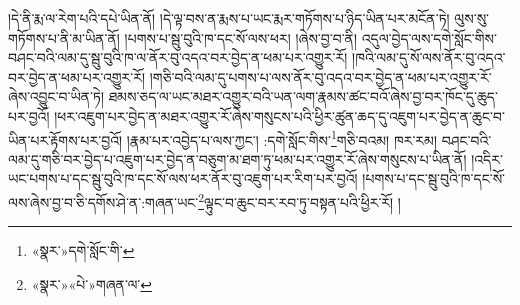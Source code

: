 །དེ་ནི་རྨ་ལ་རེག་པའི་དཔེ་ཡིན་ནོ། །དེ་ལྟ་བས་ན་རྨས་པ་ཡང་རྨར་གཏོགས་པ་ཉིད་ཡིན་པར་མངོན་ཏེ། ལུས་སུ་གཏོགས་པ་ནི་མ་ཡིན་ནོ། །པགས་པ་སྦུ་བུའི་ཁ་དང་སོ་ལས་ཕར། །ཞེས་བྱ་བ་ནི། འདུལ་བྱེད་ལས་དགེ་སློང་གིས་བཤང་བའི་ལམ་དུ་སྦུ་བུའི་ཁ་ལ་ནོར་བུ་འདའ་བར་བྱེད་ན་ཕམ་པར་འགྱུར་རོ། །ཁའི་ལམ་དུ་སོ་ལས་ནོར་བུ་འདའ་བར་བྱེད་ན་ཕམ་པར་འགྱུར་རོ། །གཅི་བའི་ལམ་དུ་པགས་པ་ལས་ནོར་བུ་འདའ་བར་བྱེད་ན་ཕམ་པར་འགྱུར་རོ་ཞེས་འབྱུང་བ་ཡིན་ཏེ། ཐམས་ཅད་ལ་ཡང་མཐར་འགྱུར་བའི་ཡན་ལག་རྣམས་ཚང་བའོ་ཞེས་བྱ་བར་ཁོང་དུ་ཆུད་པར་བྱའོ། །ཕར་འཇུག་པར་བྱེད་ན་མཐར་འགྱུར་རོ་ཞེས་གསུངས་པའི་ཕྱིར་ཚུན་ཆད་དུ་འཇུག་པར་བྱེད་ན་ཆུང་བ་ཡིན་པར་རྟོགས་པར་བྱའོ། །རྣམ་པར་འབྱེད་པ་ལས་ཀྱང་། :དགེ་སློང་གིས་\footnote{«སྣར་»དགེ་སློང་གི་}གཅི་བའམ། ཁར་རམ། བཤང་བའི་ལམ་དུ་གཅི་བར་བྱེད་པ་འཇུག་པར་བྱེད་ན་བཅུག་མ་ཐག་ཏུ་ཕམ་པར་འགྱུར་རོ་ཞེས་གསུངས་པ་ཡིན་ནོ། །འདིར་ཡང་པགས་པ་དང་སྦུ་བུའི་ཁ་དང་སོ་ལས་ཕར་ནོར་བུ་འཇུག་པར་རིག་པར་བྱའོ། །པགས་པ་དང་སྦུ་བུའི་ཁ་དང་སོ་ལས་ཞེས་བྱ་བ་ཅི་དགོས་ཤེ་ན་:གཞན་ཡང་\footnote{«སྣར་»«པེ་»གཞན་ལ་}ལྟུང་བ་ཆུང་བར་རབ་ཏུ་བསྟན་པའི་ཕྱིར་རོ། །
